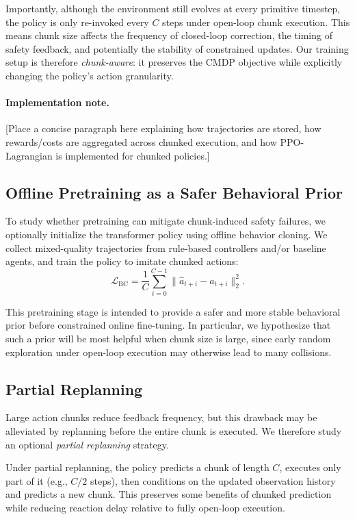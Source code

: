 \documentclass{article}
\begin{document}
Importantly, although the environment still evolves at every primitive timestep, the policy is only re-invoked every $C$ steps under open-loop chunk execution. This means chunk size affects the frequency of closed-loop correction, the timing of safety feedback, and potentially the stability of constrained updates. Our training setup is therefore \emph{chunk-aware}: it preserves the CMDP objective while explicitly changing the policy's action granularity.

\paragraph{Implementation note.}
[Place a concise paragraph here explaining how trajectories are stored, how rewards/costs are aggregated across chunked execution, and how PPO-Lagrangian is implemented for chunked policies.]

\subsection{Offline Pretraining as a Safer Behavioral Prior}

To study whether pretraining can mitigate chunk-induced safety failures, we optionally initialize the transformer policy using offline behavior cloning. We collect mixed-quality trajectories from rule-based controllers and/or baseline agents, and train the policy to imitate chunked actions:
\begin{equation}
\mathcal{L}_{\mathrm{BC}}
=
\frac{1}{C}
\sum_{i=0}^{C-1}
\|\hat{a}_{t+i} - a_{t+i}\|_2^2.
\end{equation}

This pretraining stage is intended to provide a safer and more stable behavioral prior before constrained online fine-tuning. In particular, we hypothesize that such a prior will be most helpful when chunk size is large, since early random exploration under open-loop execution may otherwise lead to many collisions.

\subsection{Partial Replanning}

Large action chunks reduce feedback frequency, but this drawback may be alleviated by replanning before the entire chunk is executed. We therefore study an optional \emph{partial replanning} strategy.

Under partial replanning, the policy predicts a chunk of length $C$, executes only part of it (e.g., $C/2$ steps), then conditions on the updated observation history and predicts a new chunk. This preserves some benefits of chunked prediction while reducing reaction delay relative to fully open-loop execution.
\end{document}
